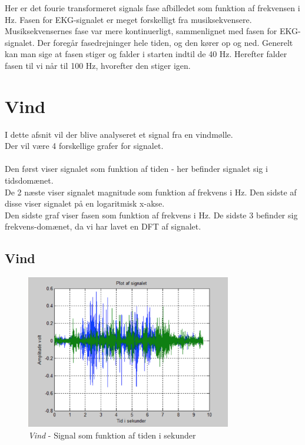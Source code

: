 Her er det fourie transformeret signals fase afbilledet som funktion af frekvensen i Hz. Fasen for EKG-signalet er meget forskelligt fra musiksekvensere. Musiksekvensernes fase var mere kontinuerligt, sammenlignet med fasen for EKG-signalet. Der foregår fasedrejninger hele tiden, og den kører op og ned. Generelt kan man sige at fasen stiger og falder i starten indtil de 40 Hz. Herefter falder fasen til vi når til 100 Hz, hvorefter den stiger igen. 


\chapter{Vind}
I dette afsnit vil der blive analyseret et signal fra en vindmølle. \\
Der vil være 4 forskellige grafer for signalet.\\ \\
Den først viser signalet som funktion af tiden - her befinder signalet sig i tidsdomænet. \\
De 2 næste viser signalet magnitude som funktion af frekvens i Hz. Den sidste af disse viser signalet på en logaritmisk x-akse. \\
Den sidste graf viser fasen som funktion af frekvens i Hz. De sidste 3 befinder sig frekvens-domænet, da vi har lavet en DFT af signalet.


\section{Vind}

\begin{figure}[H]
	\centering
	\includegraphics[width=0.8\textwidth]{Figurer/Vind}
	\caption{\textit{Vind} - Signal som funktion af tiden i sekunder}
\end{figure}

